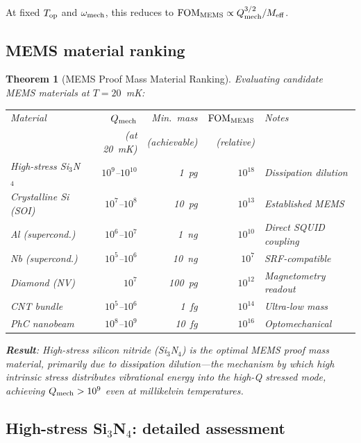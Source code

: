 \documentclass[11pt]{article}
\newtheorem{theorem}{Theorem}[section]
\theoremstyle{definition}
\theoremstyle{remark}
\newcommand{\Meff}{M_{\rm eff}}
\newcommand{\FOMMEMS}{\mathrm{FOM}_{\rm MEMS}}
\begin{document}
At fixed $T_{\rm op}$ and $\omega_{\rm mech}$, this reduces to
$\FOMMEMS \propto Q_{\rm mech}^{3/2}/\Meff$.

\subsection{MEMS material ranking}

\begin{theorem}[MEMS Proof Mass Material Ranking]
\label{thm:mems_ranking}
Evaluating candidate MEMS materials at $T = 20$~mK:

\begin{center}
\renewcommand{\arraystretch}{1.3}
\begin{tabular}{p{3cm}rrrl}
\toprule
Material & $Q_{\rm mech}$ & Min.\ mass & $\FOMMEMS$ & Notes \\
 & (at 20~mK) & (achievable) & (relative) & \\
\midrule
High-stress Si$_3$N$_4$ & $10^{9}$--$10^{10}$ & 1~pg
  & \textbf{$10^{18}$} & Dissipation dilution \\
Crystalline Si (SOI) & $10^{7}$--$10^{8}$ & 10~pg
  & $10^{13}$ & Established MEMS \\
Al (supercond.) & $10^{6}$--$10^{7}$ & 1~ng
  & $10^{10}$ & Direct SQUID coupling \\
Nb (supercond.) & $10^{5}$--$10^{6}$ & 10~ng
  & $10^{7}$ & SRF-compatible \\
Diamond (NV) & $10^{7}$ & 100~pg
  & $10^{12}$ & Magnetometry readout \\
CNT bundle & $10^{5}$--$10^{6}$ & 1~fg
  & $10^{14}$ & Ultra-low mass \\
PhC nanobeam & $10^{8}$--$10^{9}$ & 10~fg
  & $10^{16}$ & Optomechanical \\
\bottomrule
\end{tabular}
\end{center}

\textbf{Result}: High-stress silicon nitride (Si$_3$N$_4$) is the optimal
MEMS proof mass material, primarily due to \emph{dissipation dilution}---the
mechanism by which high intrinsic stress distributes vibrational energy
into the high-Q stressed mode, achieving $Q_{\rm mech} > 10^9$ even at
millikelvin temperatures.
\end{theorem}

\subsection{High-stress Si$_3$N$_4$: detailed assessment}
\end{document}
